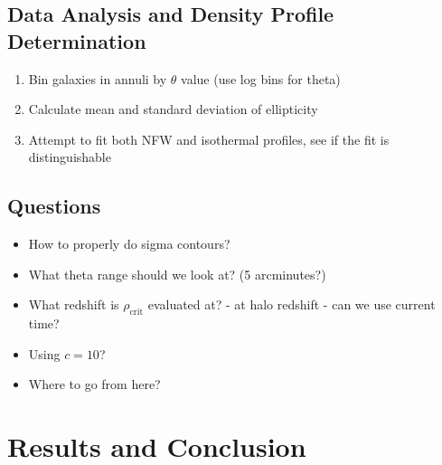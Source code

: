 \documentclass[10pt]{article}
\begin{document}
\subsection{Data Analysis and Density Profile Determination}
\begin{enumerate}
\item Bin galaxies in annuli by $\theta$ value (use log bins for theta)
\item Calculate mean and standard deviation of ellipticity
\item Attempt to fit both NFW and isothermal profiles, see if the fit is distinguishable
\end{enumerate}


\subsection{Questions}
\begin{itemize}
    \item How to properly do sigma contours?
    \item What theta range should we look at? (5 arcminutes?)
    \item What redshift is $\rho_\mathrm{crit}$ evaluated at? - at halo redshift - can we use current time?
    \item Using $c = 10$?
    \item Where to go from here?
\end{itemize}


\section{Results and Conclusion}





\end{document}
